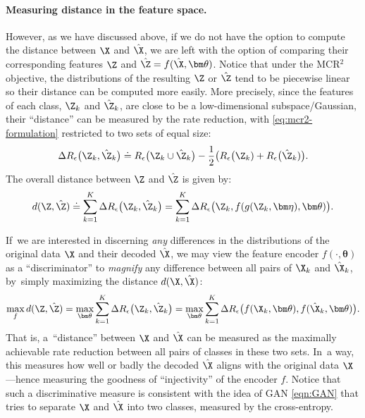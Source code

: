 \documentclass[../../book-main.tex]{subfiles}
\begin{document}
{\paragraph{Measuring distance in the feature space.}
However, as we have discussed above, if we do not have the option to compute the distance between $\X$ and $\hat \X$, we are left with the option of comparing their corresponding features $\Z$ and $\hat \Z = f(\hat \X, \bm \theta)$. Notice that under the MCR$^2$ objective, the distributions of the resulting $\Z$ or $\hat \Z$ tend to be piecewise linear so  their distance can be  computed more easily. More precisely, since the features of each class, $\Z_k$ and $\hat{\Z}_k$, are close to be a low-dimensional subspace/Gaussian, their ``distance'' can be measured by the rate reduction, {with \eqref{eq:mcr2-formulation} restricted to two sets of equal size}:
\begin{equation}
\Delta R_\epsilon\big(\Z_k, \hat{\Z}_k\big) \doteq R_\epsilon\big(\Z_k \cup \hat{\Z}_k\big) - \frac{1}{2} \big( R_\epsilon\big(\Z_k) + R_\epsilon\big(\hat \Z_k)\big).
\end{equation}
The overall distance between $\Z$ and $\hat \Z$ is given by:
\begin{equation}
d(\Z, \hat \Z) \doteq   \sum_{k=1}^K \Delta R_\epsilon\big(\Z_k, \hat{\Z}_k\big) =  \sum_{k=1}^K \Delta R_\epsilon\big(\Z_k, f(g(\Z_k, \bm\eta),\bm \theta)\big).
\label{eqn:Z-distance}
\end{equation}


If~we are interested in discerning {\em any} differences in the distributions of the original data $\X$ and their decoded $\hat \X$, we may view the feature encoder $f(\cdot, \bm \theta)$ as a ``discriminator'' to {\em magnify} any difference between all pairs of $\X_k$ and $\hat \X_k$, by~simply maximizing the distance $d(\X, \hat \X)$:
\begin{equation}
\max_f d(\Z, \hat \Z) = \max_{\bm \theta} \sum_{k=1}^K \Delta R_\epsilon\big(\Z_k, \hat{\Z}_k\big) = \max_{\bm \theta} \sum_{k=1}^K \Delta R_\epsilon\big(f(\X_k,\bm \theta), f(\hat{\X}_k,\bm \theta)\big).
    \label{eqn:max-distance}
\end{equation}
That is, a~``distance'' between $\X$ and $\hat \X$ can be measured as the maximally achievable rate reduction between all pairs of classes in these two sets. In~a way, this measures how well or badly the decoded $\hat \X$ aligns with the original data $\X$---hence measuring the goodness of ``injectivity'' of the encoder $f$. Notice that such a discriminative measure is consistent with the idea of GAN \eqref{eqn:GAN} that tries to separate $\X$ and $\hat \X$ into two classes, measured by the cross-entropy. 

}
\end{document}
